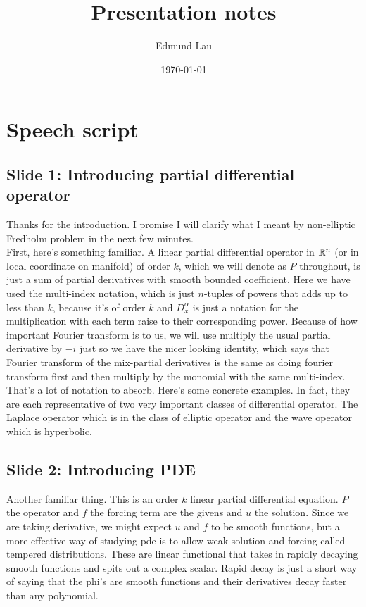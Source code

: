 \documentclass{article}
\title{Presentation notes}
\author{Edmund Lau}
\date{\today}
\begin{document}
\maketitle

\pagebreak
\section{Speech script} 

\subsection{Slide 1: Introducing partial differential operator}
Thanks for the introduction. I promise I will clarify what I meant by non-elliptic Fredholm problem in the next few minutes. \\

First, here's something familiar. A linear partial differential operator in ${\mathbb R}^n$ (or in local coordinate on manifold) of order $k$, which we will denote as $P$ throughout, is just a sum of partial derivatives with smooth bounded coefficient. Here we have used the multi-index notation, which is just $n$-tuples of powers that adds up to less than $k$, because it's of order $k$ and $D_x^\alpha$ is just a notation for the multiplication with each term raise to their corresponding power. Because of how important Fourier transform is to us, we will use multiply the usual partial derivative by $-i$ just so we have the nicer looking identity, which says that Fourier transform of the mix-partial derivatives is the same as doing fourier transform first and then multiply by the monomial with the same multi-index. \\

That's a lot of notation to absorb. Here's some concrete examples. In fact, they are each representative of two very important classes of differential operator. The Laplace operator which is in the class of elliptic operator and the wave operator which is hyperbolic. 


\subsection{Slide 2: Introducing PDE}
Another familiar thing. This is an order $k$ linear partial differential equation. $P$ the operator and $f$ the forcing term are the givens and $u$ the solution. Since we are taking derivative, we might expect $u$ and $f$ to be smooth functions, but a more effective way of studying pde is to allow weak solution and forcing called tempered distributions. These are linear functional that takes in rapidly decaying smooth functions and spits out a complex scalar. Rapid decay is just a short way of saying that the phi's are smooth functions and their derivatives decay faster than any polynomial. \\
\end{document}
